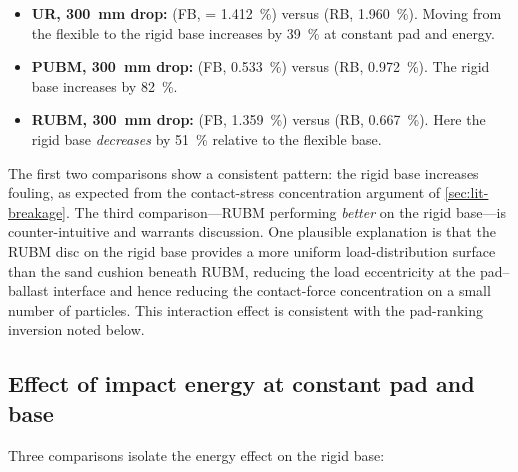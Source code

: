 \begin{itemize}[leftmargin=*,itemsep=4pt]
    \item \textbf{\gls{UR}, \SI{300}{\milli\metre} drop:}
           (\gls{FB}, \FIIN{} = \SI{1.412}{\percent})
          versus  (\gls{RB}, \SI{1.960}{\percent}).
          Moving from the flexible to the rigid base increases \FIIN{}
          by \SI{39}{\percent} at constant pad and energy.
    \item \textbf{\gls{PUBM}, \SI{300}{\milli\metre} drop:}
           (\gls{FB}, \SI{0.533}{\percent}) versus
           (\gls{RB}, \SI{0.972}{\percent}). The rigid
          base increases \FIIN{} by \SI{82}{\percent}.
    \item \textbf{\gls{RUBM}, \SI{300}{\milli\metre} drop:}
           (\gls{FB}, \SI{1.359}{\percent}) versus
           (\gls{RB}, \SI{0.667}{\percent}). Here the
          rigid base \emph{decreases} \FIIN{} by \SI{51}{\percent}
          relative to the flexible base.
\end{itemize}

The first two comparisons show a consistent pattern: the rigid base
increases fouling, as expected from the contact-stress concentration
argument of \cref{sec:lit-breakage}. The third comparison---\gls{RUBM}
performing \emph{better} on the rigid base---is counter-intuitive and
warrants discussion. One plausible explanation is that the \gls{RUBM}
disc on the rigid base provides a more uniform load-distribution surface
than the sand cushion beneath \gls{RUBM}, reducing the load eccentricity
at the pad--ballast interface and hence reducing the contact-force
concentration on a small number of particles. This interaction effect
is consistent with the pad-ranking inversion noted below.

\subsection{Effect of impact energy at constant pad and base}
\label{sec:imp-energy-effect}

Three comparisons isolate the energy effect on the rigid base:

